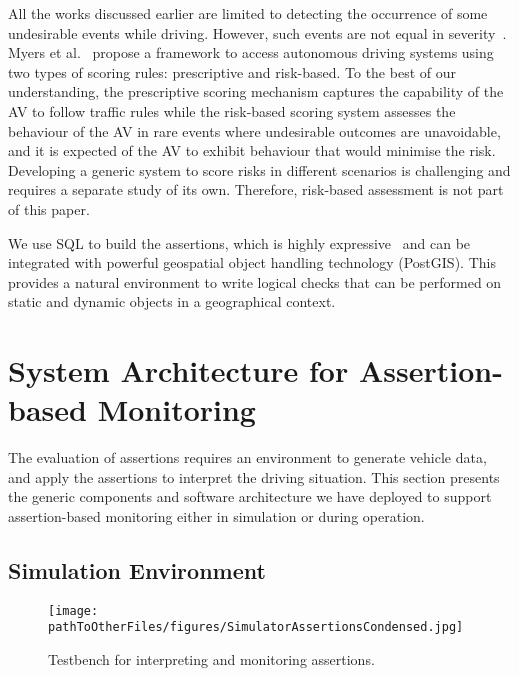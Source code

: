 All the works discussed earlier are limited to detecting the occurrence of some undesirable events while driving. However, such events are not equal in severity~\cite{sinha}. Myers et al.~\cite{myers} propose a framework to access autonomous driving systems using two types of scoring rules: prescriptive and risk-based. To the best of our understanding, the prescriptive scoring mechanism captures the capability of the AV to follow traffic rules while the risk-based scoring system assesses the behaviour of the AV in rare events where undesirable outcomes are unavoidable, and it is expected of the AV to exhibit behaviour that would minimise the risk. Developing a generic system to score risks in different scenarios is challenging and requires a separate study of its own. Therefore, risk-based assessment is not part of this paper.

We use SQL to build the assertions, which is highly expressive~\cite{sqllibkin} and can be integrated with powerful geospatial object handling technology (PostGIS). This provides a natural environment to write logical checks that can be performed on static and dynamic objects in a geographical context. 
%



\section{System Architecture for Assertion-based Monitoring} \label{generic_architecture}

The evaluation of assertions requires an environment to generate vehicle data, and apply the assertions to interpret the driving situation. This section presents the generic components and software architecture we have deployed to support assertion-based monitoring either in simulation or during operation.

\subsection{Simulation Environment} \label{generic_sim_system}

\begin{figure}
    \centering
    \texttt{[image: \\pathToOtherFiles/figures/SimulatorAssertionsCondensed.jpg]}
    \caption{Testbench for interpreting and monitoring assertions.}
    \label{fig:SimulatorArchitecture}
\end{figure}



